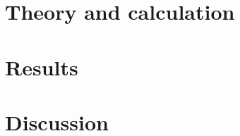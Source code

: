 \documentclass[final,1p,times,authoryear]{elsarticle}
\begin{document}





\section{Theory and calculation}


\section{Results}

\section{Discussion}
\end{document}
